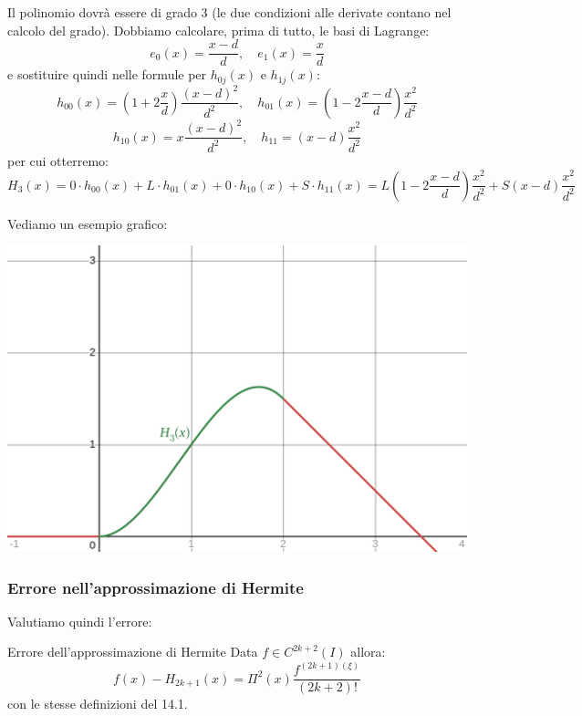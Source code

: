 \documentclass[a4paper,11pt]{article}
\begin{document}
Il polinomio dovrà essere di grado 3 (le due condizioni alle derivate contano nel calcolo del grado).
Dobbiamo calcolare, prima di tutto, le basi di Lagrange:
$$
e_0(x) = \frac{x - d}{d}, \quad e_1(x) = \frac{x}{d}
$$
e sostituire quindi nelle formule per $h_{0j}(x)$ e $h_{1j}(x)$:
$$
h_{00}(x) = \left( 1 + 2\frac{x}{d} \right) \frac{(x - d)^2}{d^2}, \quad h_{01}(x) = \left( 1 - 2 \frac{x - d}{d} \right) \frac{x^2}{d^2}
$$
$$
h_{10}(x) = x \frac{(x - d)^2}{d^2}, \quad h_{11} = (x - d) \frac{x^2}{d^2}
$$
per cui otterremo:
$$
H_3(x) = 0 \cdot h_{00}(x) + L \cdot h_{01}(x) + 0 \cdot h_{10}(x) + S \cdot h_{11}(x) = L \left( 1 - 2 \frac{x - d}{d} \right) \frac{x^2}{d^2} + S (x - d) \frac{x^2}{d^2}
$$

Vediamo un esempio grafico:
\begin{center}
	\includegraphics[scale=0.28]{../figures/tracks.png}
\end{center}

\subsubsection{Errore nell'approssimazione di Hermite}
Valutiamo quindi l'errore:
\begin{theorem}{Errore dell'approssimazione di Hermite}
	Data $f \in C^{2k + 2}(I)$ allora:
$$
f(x) - H_{2k + 1}(x) = \Pi^2 (x) \frac{f^{(2k + 1)(\xi)}}{(2k + 2)!}
$$
con le stesse definizioni del 14.1.
\end{theorem}
\end{document}
